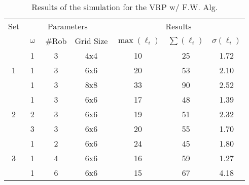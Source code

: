 \begin{table}[H]
\centering
\begin{tabular}{@{}ccccccc@{}}
\toprule
Set                & \multicolumn{3}{c}{Parameters}  & \multicolumn{3}{c}{Results}              \\ \cmidrule(lr){2-4} \cmidrule(lr){5-7}
                   & $\upomega$ & \#Rob & Grid Size & $\max(\ell_i)$ & $\sum(\ell_i)$ & $\sigma(\ell_i)$ \\ \midrule
\multirow{3}{*}{1} & 1           & 3     & 4x4       &    10        &  25        &   1.72   \\
                             & 1           & 3     & 6x6       &      20      &  53       &   2.10    \\
                             & 1           & 3     & 8x8       &     33      &  90      &   2.52    \\ \midrule
\multirow{3}{*}{2} & 1           & 3     & 6x6       &      17      &  48       &  1.39     \\
                             & 2           & 3     & 6x6       &      19      &  51       &  2.32     \\
                             & 3           & 3     & 6x6       &     20      &  55       &  1.70     \\ \midrule
\multirow{3}{*}{3} & 1           & 2     & 6x6       &     24      &  45       &   1.80        \\
                             & 1           & 4     & 6x6       &     16       &  59       &   1.27            \\
                             & 1           & 6     & 6x6       &     15      &  67        &    4.18        \\ \bottomrule                             
\end{tabular}
\caption{Results of the simulation for the VRP w/ F.W. Alg.}
\label{tab:VRP_FW_results1}
\end{table}

